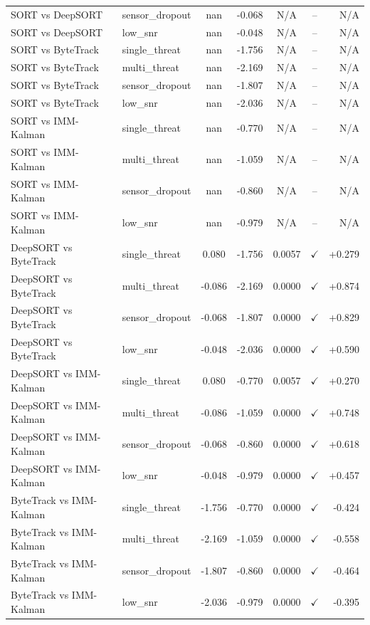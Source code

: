 \begin{table}[ht]
\begin{tabular}{llccccr}
SORT vs DeepSORT & sensor_dropout & nan & -0.068 & N/A & -- & N/A \\
SORT vs DeepSORT & low_snr & nan & -0.048 & N/A & -- & N/A \\
SORT vs ByteTrack & single_threat & nan & -1.756 & N/A & -- & N/A \\
SORT vs ByteTrack & multi_threat & nan & -2.169 & N/A & -- & N/A \\
SORT vs ByteTrack & sensor_dropout & nan & -1.807 & N/A & -- & N/A \\
SORT vs ByteTrack & low_snr & nan & -2.036 & N/A & -- & N/A \\
SORT vs IMM-Kalman & single_threat & nan & -0.770 & N/A & -- & N/A \\
SORT vs IMM-Kalman & multi_threat & nan & -1.059 & N/A & -- & N/A \\
SORT vs IMM-Kalman & sensor_dropout & nan & -0.860 & N/A & -- & N/A \\
SORT vs IMM-Kalman & low_snr & nan & -0.979 & N/A & -- & N/A \\
DeepSORT vs ByteTrack & single_threat & 0.080 & -1.756 & 0.0057 & $\checkmark$ & +0.279 \\
DeepSORT vs ByteTrack & multi_threat & -0.086 & -2.169 & 0.0000 & $\checkmark$ & +0.874 \\
DeepSORT vs ByteTrack & sensor_dropout & -0.068 & -1.807 & 0.0000 & $\checkmark$ & +0.829 \\
DeepSORT vs ByteTrack & low_snr & -0.048 & -2.036 & 0.0000 & $\checkmark$ & +0.590 \\
DeepSORT vs IMM-Kalman & single_threat & 0.080 & -0.770 & 0.0057 & $\checkmark$ & +0.270 \\
DeepSORT vs IMM-Kalman & multi_threat & -0.086 & -1.059 & 0.0000 & $\checkmark$ & +0.748 \\
DeepSORT vs IMM-Kalman & sensor_dropout & -0.068 & -0.860 & 0.0000 & $\checkmark$ & +0.618 \\
DeepSORT vs IMM-Kalman & low_snr & -0.048 & -0.979 & 0.0000 & $\checkmark$ & +0.457 \\
ByteTrack vs IMM-Kalman & single_threat & -1.756 & -0.770 & 0.0000 & $\checkmark$ & -0.424 \\
ByteTrack vs IMM-Kalman & multi_threat & -2.169 & -1.059 & 0.0000 & $\checkmark$ & -0.558 \\
ByteTrack vs IMM-Kalman & sensor_dropout & -1.807 & -0.860 & 0.0000 & $\checkmark$ & -0.464 \\
ByteTrack vs IMM-Kalman & low_snr & -2.036 & -0.979 & 0.0000 & $\checkmark$ & -0.395 \\
\bottomrule
\end{tabular}
\end{table}